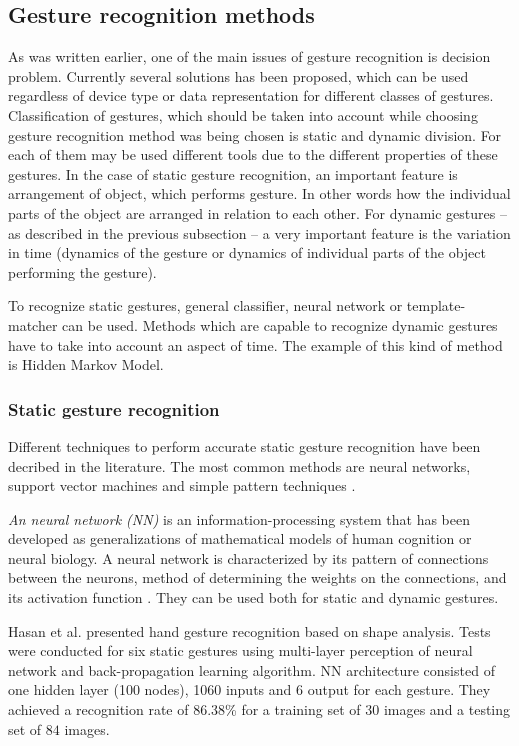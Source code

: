 \subsection{Gesture recognition methods}
As was written earlier, one of the main issues of gesture recognition is decision problem. Currently several solutions has been proposed, which can be used regardless of device type or data representation for different classes of gestures. Classification of gestures, which should be taken into account while choosing gesture recognition method was being chosen is static and dynamic division. For each of them may be used different tools due to the different properties of these gestures. In the case of static gesture recognition, an important feature is arrangement of object, which performs gesture. In other words how the individual parts of the object are arranged in relation to each other. For dynamic gestures -- as described in the previous subsection -- a very important feature is the variation in time (dynamics of the gesture or dynamics of individual parts of the object performing the gesture).

To recognize static gestures, general classifier, neural network or template-matcher can be used. Methods which are capable to recognize dynamic gestures have to take into account an aspect of time. The example of this kind of method is Hidden Markov Model.

\subsubsection{Static gesture recognition}

Different techniques to perform accurate static gesture recognition have been decribed in the literature. The most common methods are neural networks, support vector machines and simple pattern techniques \cite{journals/jbcs/SavarisW10}.

\emph{An neural network (NN)} is an information-processing system that has been developed as generalizations of mathematical models of human cognition or neural biology. A neural network is characterized by its pattern of connections between the neurons, method of determining the weights on the connections, and its activation function \cite{Fausett:1994:FNN:197023}. They can be used both for static and dynamic gestures.

Hasan et al. \cite{HasanStaticHand} presented hand gesture recognition based on shape analysis. Tests were conducted for six static gestures using multi-layer perception of neural network and back-propagation learning algorithm. NN architecture consisted of one hidden layer (100 nodes), 1060 inputs and $6$ output for each gesture. They achieved a recognition rate of 86.38\% for a training set of $30$ images and a testing set of $84$ images.

